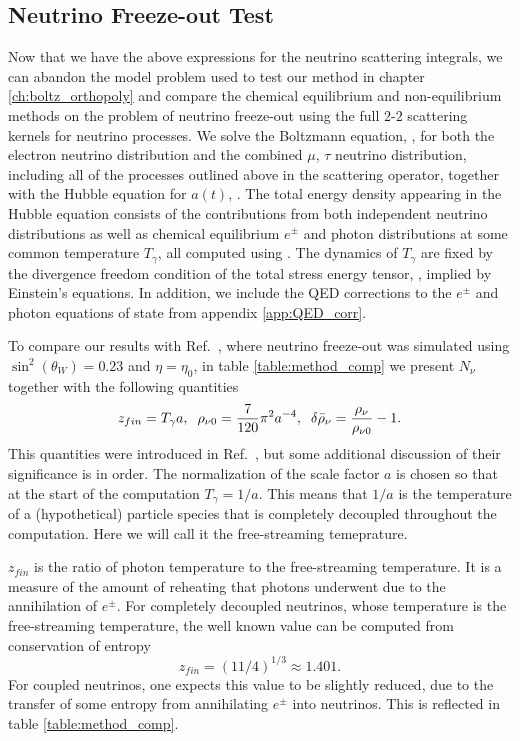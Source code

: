 
\subsection{ Neutrino Freeze-out Test}
Now that we have the above expressions for the neutrino scattering integrals, we can abandon the model problem used to test our method in chapter \ref{ch:boltz_orthopoly} and compare the chemical equilibrium and non-equilibrium methods on the problem of neutrino freeze-out using the full $2$-$2$ scattering kernels for neutrino processes.  We solve the Boltzmann equation, , for both the electron neutrino distribution and the combined $\mu$, $\tau$ neutrino distribution, including all of the  processes outlined above in the scattering operator, together with the Hubble equation for $a(t)$, .  The total energy density  appearing in the Hubble equation consists of the contributions from both independent neutrino distributions as well as chemical equilibrium $e^\pm$ and photon distributions at some common temperature $T_\gamma$, all computed using .  The dynamics of $T_\gamma$ are fixed by the divergence freedom condition of the total stress energy tensor, , implied by Einstein's equations.  In addition, we include the QED corrections to the $e^\pm$ and photon equations of state from appendix \ref{app:QED_corr}.



To compare our results with Ref.~\cite{Mangano2005}, where neutrino freeze-out was simulated using $\sin^2(\theta_W)=0.23$ and $\eta=\eta_0$, in table \ref{table:method_comp} we present $N_\nu$ together with the following quantities
\begin{align}
 z_{fin}=T_\gamma a,\hspace{2mm}  \rho_{\nu 0}=\frac{7}{120}\pi^2a^{-4}, \hspace{2mm}  \delta\bar\rho_{\nu}= \frac{\rho_\nu}{\rho_{\nu 0}}-1.
\end{align}
This quantities were introduced in Ref.~\cite{Mangano2005}, but some additional discussion of their significance is in order.  The normalization of the scale factor $a$ is chosen so that at the start of the computation $T_\gamma=1/a$.  This means that $1/a$ is the temperature of a (hypothetical) particle species that is completely decoupled throughout the computation.  Here we will call it the free-streaming temeprature.  

 $z_{fin}$ is the ratio of photon temperature to the free-streaming temperature.  It is a measure of the amount of reheating that photons underwent due to the annihilation of $e^\pm$.  For completely decoupled neutrinos, whose temperature is the free-streaming temperature, the well known value can be computed from conservation of entropy
\begin{equation}
z_{fin}=(11/4)^{1/3}\approx 1.401.
\end{equation}
For coupled neutrinos, one expects this value to be slightly reduced, due to the  transfer of some entropy from annihilating $e^\pm$ into neutrinos. This is reflected in table \ref{table:method_comp}.

